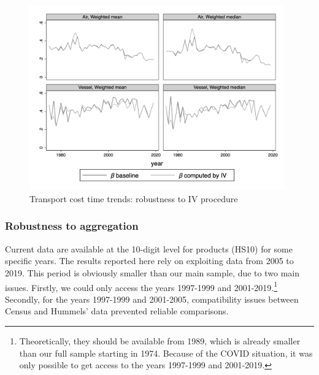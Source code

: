 \documentclass[a4paper,11pt]{article}
\begin{document}
\begin{figure}[htbp]
\caption{Transport cost time trends: robustness to IV procedure}
\label{fig:comp_IV_SITC5}
\begin{center}
\includegraphics[height=8cm]
{scatter_chronology_baseline_IV_ref1_y_5_3.png}
\end{center}
\end{figure}



\subsubsection{Robustness to aggregation}

Current data are available at the 10-digit level for products (HS10) for some specific years. The results reported here rely on exploiting data from 2005 to 2019. This period is obviously smaller than our main sample, due to two main issues. Firstly, we could only access the years 1997-1999 and 2001-2019.\footnote{Theoretically, they should be available from 1989, which is already smaller than our full sample starting in 1974. Because of the COVID situation, it was only possible to get access to the years 1997-1999 and 2001-2019.} Secondly, for the years 1997-1999 and 2001-2005, compatibility issues between Census and Hummels' data prevented reliable comparisons.
\end{document}
